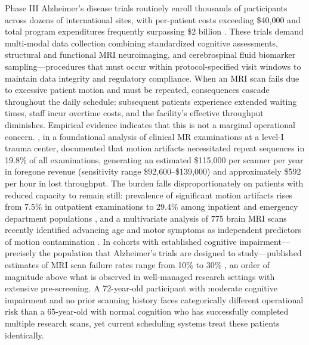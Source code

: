 \documentclass[11pt,a4paper]{article}
\begin{document}
Phase III Alzheimer's disease trials routinely enroll thousands of participants across dozens of international sites, with per-patient costs exceeding \$40,000 and total program expenditures frequently surpassing \$2 billion \citep{cummings2014clinical}. These trials demand multi-modal data collection combining standardized cognitive assessments, structural and functional MRI neuroimaging, and cerebrospinal fluid biomarker sampling---procedures that must occur within protocol-specified visit windows to maintain data integrity and regulatory compliance. When an MRI scan fails due to excessive patient motion and must be repeated, consequences cascade throughout the daily schedule: subsequent patients experience extended waiting times, staff incur overtime costs, and the facility's effective throughput diminishes. Empirical evidence indicates that this is not a marginal operational concern. \citet{andre2015quantifying}, in a foundational analysis of clinical MR examinations at a level-I trauma center, documented that motion artifacts necessitated repeat sequences in 19.8\% of all examinations, generating an estimated \$115{,}000 per scanner per year in foregone revenue (sensitivity range \$92{,}600--\$139{,}000) and approximately \$592 per hour in lost throughput. The burden falls disproportionately on patients with reduced capacity to remain still: prevalence of significant motion artifacts rises from 7.5\% in outpatient examinations to 29.4\% among inpatient and emergency department populations \citep{andre2015quantifying}, and a multivariate analysis of 775 brain MRI scans recently identified advancing age and motor symptoms as independent predictors of motion contamination \citep{krag2025motion}. In cohorts with established cognitive impairment---precisely the population that Alzheimer's trials are designed to study---published estimates of MRI scan failure rates range from 10\% to 30\% \citep{porembka2025disparities}, an order of magnitude above what is observed in well-managed research settings with extensive pre-screening. A 72-year-old participant with moderate cognitive impairment and no prior scanning history faces categorically different operational risk than a 65-year-old with normal cognition who has successfully completed multiple research scans, yet current scheduling systems treat these patients identically.
\end{document}
